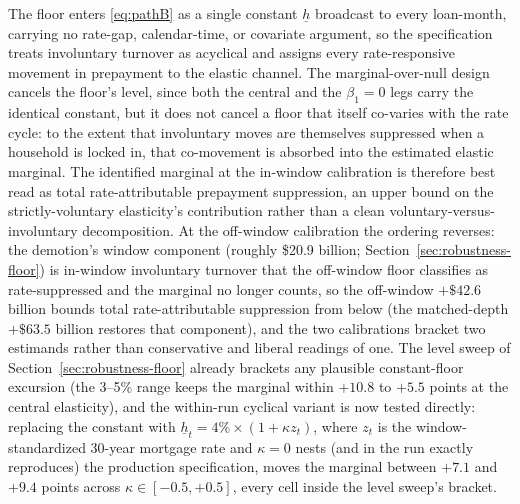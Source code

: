 \documentclass[12pt]{article}
\begin{document}
The floor enters \eqref{eq:pathB} as a single constant $\underline{h}$ broadcast to every loan-month, carrying no rate-gap, calendar-time, or covariate argument, so the specification treats involuntary turnover as acyclical and assigns every rate-responsive movement in prepayment to the elastic channel. The marginal-over-null design cancels the floor's level, since both the central and the $\beta_1 = 0$ legs carry the identical constant, but it does not cancel a floor that itself co-varies with the rate cycle: to the extent that involuntary moves are themselves suppressed when a household is locked in, that co-movement is absorbed into the estimated elastic marginal. The identified marginal at the in-window calibration is therefore best read as total rate-attributable prepayment suppression, an upper bound on the strictly-voluntary elasticity's contribution rather than a clean voluntary-versus-involuntary decomposition. At the off-window calibration the ordering reverses: the demotion's window component (roughly \$20.9 billion; Section~\ref{sec:robustness-floor}) is in-window involuntary turnover that the off-window floor classifies as rate-suppressed and the marginal no longer counts, so the off-window $+\$42.6$ billion bounds total rate-attributable suppression from below (the matched-depth $+\$63.5$ billion restores that component), and the two calibrations bracket two estimands rather than conservative and liberal readings of one. The level sweep of Section~\ref{sec:robustness-floor} already brackets any plausible constant-floor excursion (the 3--5\% range keeps the marginal within $+10.8$ to $+5.5$ points at the central elasticity), and the within-run cyclical variant is now tested directly: replacing the constant with $\underline{h}_t = 4\% \times (1 + \kappa z_t)$, where $z_t$ is the window-standardized 30-year mortgage rate and $\kappa = 0$ nests (and in the run exactly reproduces) the production specification, moves the marginal between $+7.1$ and $+9.4$ points across $\kappa \in [-0.5, +0.5]$, every cell inside the level sweep's bracket.
\end{document}

